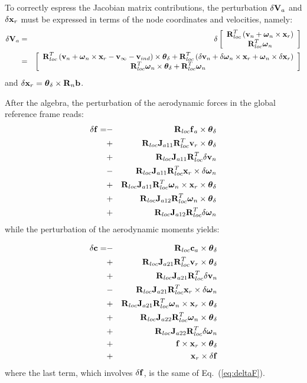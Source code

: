 To correctly espress the Jacobian matrix contributions, the perturbation 
$\delta\T{V}_a$ and $\delta \T{x}_r$ must be expressed in terms of 
the node coordinates and velocities, namely:
\begin{eqnarray}
	\delta\T{V}_a &=& \delta\sqbr{\matr{c}{
		\T{R}^T_{loc} \plbr{\T{v}_n + \T{\omega}_n\times\T{x}_r}\\
		\T{R}^T_{loc} \T{\omega}_n
		}} \\
\nonumber&=&\sqbr{\matr{c}{
	\T{R}^T_{loc}\plbr{
			\T{v}_n + \T{\omega}_n\times\T{x}_r 
			- \T{v}_{\infty} - \T{v}_{ind}} \times \T{\theta}_\delta+ 
			\T{R}^T_{loc}\plbr{
				\delta\T{v}_n + \delta\T{\omega}_n\times\T{x}_r +
				\T{\omega}_n\times\delta\T{x}_r}\\
	\T{R}^T_{loc}\T{\omega}_n \times\T{\theta}_\delta+ \T{R}^T_{loc}\T{\omega}_n
	}}
\end{eqnarray}
and $\delta\T{x}_r = \T{\theta}_\delta\times\T{R}_n\T{b}$.

After the algebra, the perturbation of the aerodynamic forces  
in the global reference frame reads:
\begin{eqnarray}\label{eq:deltaF}
\nonumber \delta\T{f} = 
\nonumber	&-& \T{R}_{loc}\T{f}_a\times\T{\theta}_\delta \\
\nonumber	&+& \T{R}_{loc}\T{J}_{a11}\T{R}^T_{loc}\T{v}_r\times\T{\theta}_\delta\\
\nonumber	&+& \T{R}_{loc}\T{J}_{a11}\T{R}^T_{loc}\delta\T{v}_n\\
\nonumber	&-& \T{R}_{loc}\T{J}_{a11}\T{R}^T_{loc}
			\T{x}_r\times\delta\T{\omega}_n\\
\nonumber	&+& \T{R}_{loc}\T{J}_{a11}\T{R}^T_{loc}
			\T{\omega}_n\times\T{x}_r\times\T{\theta}_\delta\\
\nonumber	&+& \T{R}_{loc}\T{J}_{a12}\T{R}^T_{loc}\T{\omega}_n
			\times\T{\theta}_\delta\\
		&+& \T{R}_{loc}\T{J}_{a12}\T{R}^T_{loc}\delta\T{\omega}_n
\end{eqnarray}
while the perturbation of the aerodynamic moments yields:

\begin{eqnarray}
\nonumber \delta\T{c} = 
\nonumber	&-& \T{R}_{loc}\T{c}_a\times\T{\theta}_\delta \\
\nonumber	&+& \T{R}_{loc}\T{J}_{a21}\T{R}^T_{loc}\T{v}_r\times\T{\theta}_\delta\\
\nonumber	&+& \T{R}_{loc}\T{J}_{a21}\T{R}^T_{loc}\delta\T{v}_n\\
\nonumber	&-& \T{R}_{loc}\T{J}_{a21}\T{R}^T_{loc}
			\T{x}_r\times\delta\T{\omega}_n\\
\nonumber	&+& \T{R}_{loc}\T{J}_{a21}\T{R}^T_{loc}
			\T{\omega}_n\times\T{x}_r\times\T{\theta}_\delta\\
\nonumber	&+& \T{R}_{loc}\T{J}_{a22}\T{R}^T_{loc}\T{\omega}_n
			\times\T{\theta}_\delta\\
\nonumber	&+& \T{R}_{loc}\T{J}_{a22}\T{R}^T_{loc}\delta\T{\omega}_n\\
\nonumber 	&+& \T{f}\times\T{x}_r\times\T{\theta}_\delta\\
		&+& \T{x}_r \times \delta\T{f}
\end{eqnarray}
where the last term, which involves $\delta\T{f}$, is the same of
Eq.~(\ref{eq:deltaF}).



